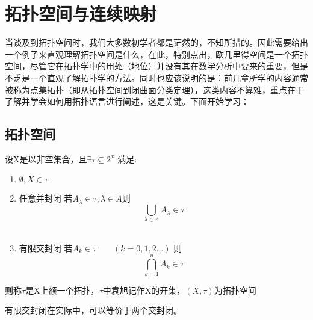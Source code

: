 \chapter{拓扑空间与连续映射}
当谈及到拓扑空间时，我们大多数初学者都是茫然的，不知所措的。因此需要给出一个例子来直观理解拓扑空间是什么，在此，特别点出，欧几里得空间是一个拓扑空间，尽管它在拓扑学中的用处（地位）并没有其在数学分析中要来的重要，但是不乏是一个直观了解拓扑学的方法。同时也应该说明的是：前几章所学的内容通常被称为点集拓扑（即从拓扑空间到闭曲面分类定理），这类内容不算难，重点在于了解并学会如何用拓扑语言进行阐述，这是关键。下面开始学习：
\section{拓扑空间}
\begin{definition}[拓扑]
    设X是以非空集合，且\(\exists \tau \subseteq 2^{x}\) 满足:
    \begin{enumerate}
        \item \(\emptyset , X \in \tau \) \\
        \item 任意并封闭 若\(A_{\lambda} \in \tau ,\lambda \in A\)则 \[\bigcup_{\lambda \in \Lambda }A_{\lambda} \in \tau\] \\
        \item 有限交封闭 若\(A_{k} \in \tau \qquad \left(k=0,1,2 \dots\right)\) 则 \[\bigcap_{k=1}^{n}A_k \in \tau\]
    \end{enumerate}
    则称\(\tau\)是X上额一个拓扑，\(\tau\)中袁旭记作X的开集，\(\left(X, \tau\right)\)为拓扑空间
\end{definition}
\begin{remark}
    有限交封闭在实际中，可以等价于两个交封闭。
\end{remark}
